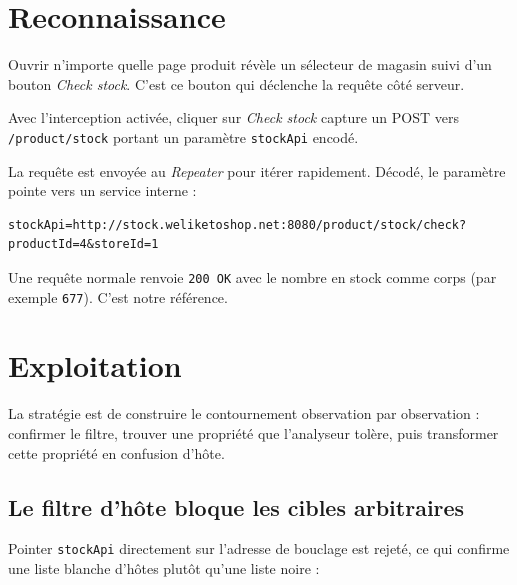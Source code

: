 \documentclass[11pt,a4paper]{article}
\begin{document}

\section{Reconnaissance}
Ouvrir n'importe quelle page produit révèle un sélecteur de magasin suivi d'un
bouton \emph{Check stock}. C'est ce bouton qui déclenche la requête côté
serveur.


Avec l'interception activée, cliquer sur \emph{Check stock} capture un POST
vers \texttt{/product/stock} portant un paramètre \texttt{stockApi} encodé.


La requête est envoyée au \emph{Repeater} pour itérer rapidement. Décodé, le
paramètre pointe vers un service interne :

\begin{lstlisting}
stockApi=http://stock.weliketoshop.net:8080/product/stock/check?productId=4&storeId=1
\end{lstlisting}

Une requête normale renvoie \texttt{200 OK} avec le nombre en stock comme corps
(par exemple \texttt{677}). C'est notre référence.


\section{Exploitation}
La stratégie est de construire le contournement observation par observation :
confirmer le filtre, trouver une propriété que l'analyseur tolère, puis
transformer cette propriété en confusion d'hôte.

\subsection{Le filtre d'hôte bloque les cibles arbitraires}
Pointer \texttt{stockApi} directement sur l'adresse de bouclage est rejeté, ce
qui confirme une liste blanche d'hôtes plutôt qu'une liste noire :
\end{document}
